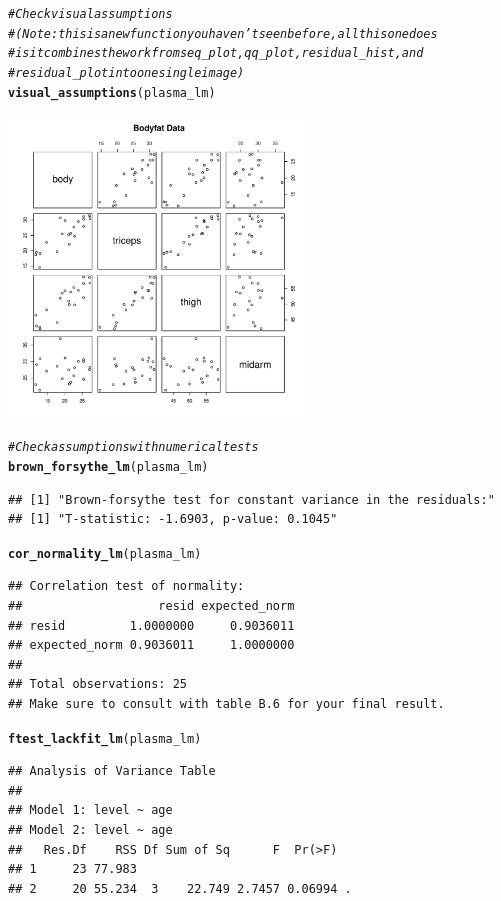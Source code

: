\documentclass{article}\usepackage[]{graphicx}\usepackage[]{color}
\makeatletter
\newcommand{\hlcom}[1]{\textcolor[rgb]{0.678,0.584,0.686}{\textit{#1}}}%
\newcommand{\hlstd}[1]{\textcolor[rgb]{0.345,0.345,0.345}{#1}}%
\newcommand{\hlkwd}[1]{\textcolor[rgb]{0.737,0.353,0.396}{\textbf{#1}}}%
\newenvironment{kframe}{%
 \def\at@end@of@kframe{}%
 \ifinner\ifhmode%
  \def\at@end@of@kframe{\end{minipage}}%
  \begin{minipage}{\columnwidth}%
 \fi\fi%
 \def\FrameCommand##1{\hskip\@totalleftmargin \hskip-\fboxsep
 \colorbox{shadecolor}{##1}\hskip-\fboxsep
     \hskip-\linewidth \hskip-\@totalleftmargin \hskip\columnwidth}%
 \MakeFramed {\advance\hsize-\width
   \@totalleftmargin\z@ \linewidth\hsize
   \@setminipage}}%
 {\par\unskip\endMakeFramed%
 \at@end@of@kframe}
\newenvironment{knitrout}{}{} %
\makeatother
\begin{document}
\begin{knitrout}
\begin{kframe}
\begin{alltt}
\hlcom{# Check visual assumptions}
\hlcom{# (Note: this is a new function you haven't seen before, all this one does}
\hlcom{# is it combines the work from seq_plot, qq_plot, residual_hist, and}
\hlcom{# residual_plot into one single image)}
\hlkwd{visual_assumptions}\hlstd{(plasma_lm)}
\end{alltt}
\end{kframe}
\includegraphics[width=0.6\textwidth]{figure/unnamed-chunk-1-1} 
\begin{kframe}\begin{alltt}
\hlcom{# Check assumptions with numerical tests}
\hlkwd{brown_forsythe_lm}\hlstd{(plasma_lm)}
\end{alltt}
\begin{verbatim}
## [1] "Brown-forsythe test for constant variance in the residuals:"
## [1] "T-statistic: -1.6903, p-value: 0.1045"
\end{verbatim}
\begin{alltt}
\hlkwd{cor_normality_lm}\hlstd{(plasma_lm)}
\end{alltt}
\begin{verbatim}
## Correlation test of normality:
##                   resid expected_norm
## resid         1.0000000     0.9036011
## expected_norm 0.9036011     1.0000000
## 
## Total observations: 25
## Make sure to consult with table B.6 for your final result.
\end{verbatim}
\begin{alltt}
\hlkwd{ftest_lackfit_lm}\hlstd{(plasma_lm)}
\end{alltt}
\begin{verbatim}
## Analysis of Variance Table
## 
## Model 1: level ~ age
## Model 2: level ~ age
##   Res.Df    RSS Df Sum of Sq      F  Pr(>F)  
## 1     23 77.983                              
## 2     20 55.234  3    22.749 2.7457 0.06994 .

\end{verbatim}
\end{kframe}
\end{knitrout}
\end{document}
